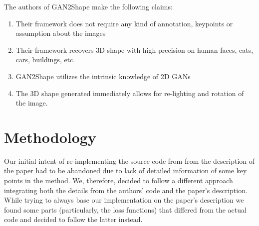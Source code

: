 


The authors of GAN2Shape make the following claims:
\begin{enumerate}
    \item Their framework does not require any kind of annotation, keypoints or assumption about the images
    \item Their framework recovers 3D shape with high precision on human faces, cats, cars, buildings, etc.
    \item GAN2Shape utilizes the intrinsic knowledge of 2D GANs
    \item The 3D shape generated immediately allows for re-lighting and rotation of the image.
\end{enumerate}

\section{Methodology}
\label{sec:methodology}
Our initial intent of re-implementing the source code from from the description of the paper had to be abandoned due to lack of detailed information of some key points in the method. We, therefore, decided to follow a different approach integrating both the details from the authors' code and the paper's description. While trying to always base our implementation on the paper's description we found some parts (particularly, the loss functions) that differed from the actual code and decided to follow the latter instead.

